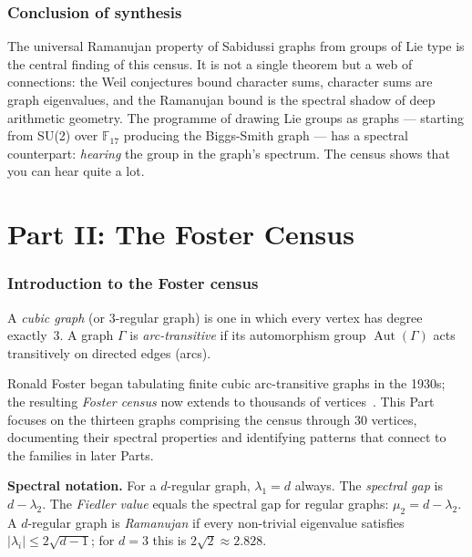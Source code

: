 \documentclass[11pt,a4paper]{article}
\theoremstyle{plain}
\theoremstyle{definition}
\theoremstyle{remark}
\newcommand{\F}{\mathbb{F}}
\newcommand{\Aut}{\operatorname{Aut}}
\begin{document}
\section{Conclusion of synthesis}

The universal Ramanujan property of Sabidussi graphs from groups of Lie
type is the central finding of this census. It is not a single theorem but
a web of connections: the Weil conjectures bound character sums, character
sums are graph eigenvalues, and the Ramanujan bound is the spectral shadow
of deep arithmetic geometry. The programme of drawing Lie groups as graphs
--- starting from SU(2) over $\F_{17}$ producing the Biggs-Smith graph ---
has a spectral counterpart: \emph{hearing} the group in the graph's
spectrum. The census shows that you can hear quite a lot.


%
%

\newpage
\part*{Part II: The Foster Census}

\section{Introduction to the Foster census}

A \emph{cubic graph} (or 3-regular graph) is one in which every vertex has
degree exactly~3. A graph $\Gamma$ is \emph{arc-transitive} if its
automorphism group $\Aut(\Gamma)$ acts transitively on directed edges
(arcs).

Ronald Foster began tabulating finite cubic arc-transitive graphs in the
1930s; the resulting \emph{Foster census} now extends to thousands of
vertices~\cite{foster1988,conder2002}. This Part focuses on the thirteen
graphs comprising the census through 30 vertices, documenting their spectral
properties and identifying patterns that connect to the families in later
Parts.

\begin{tcolorbox}[colback=yellow!10, colframe=yellow!10,
  boxrule=0pt, sharp corners]
\textbf{Spectral notation.}
For a $d$-regular graph, $\lambda_1 = d$ always. The \emph{spectral gap}
is $d - \lambda_2$. The \emph{Fiedler value} equals the spectral gap for
regular graphs: $\mu_2 = d - \lambda_2$.
A $d$-regular graph is \emph{Ramanujan} if every non-trivial eigenvalue
satisfies $|\lambda_i| \leq 2\sqrt{d-1}$; for $d = 3$ this is
$2\sqrt{2} \approx 2.828$.
\end{tcolorbox}
\end{document}
